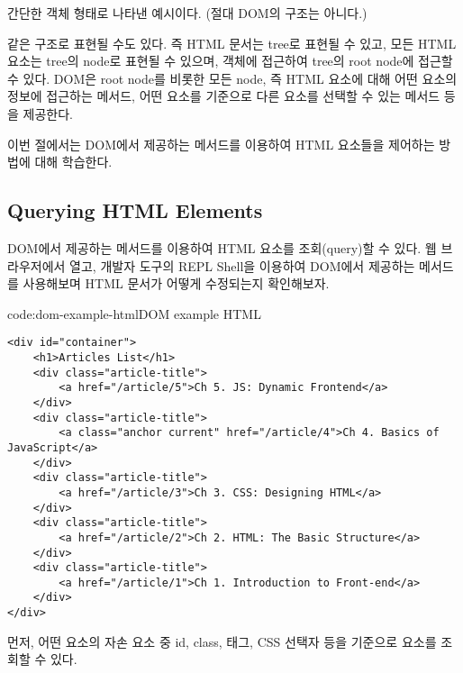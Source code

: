 \는 \을 간단한 객체 형태로 나타낸 예시이다. (절대 DOM의 구조는 아니다.)

    {}

\은 \와 같은 구조로 표현될 수도 있다. 즉 HTML 문서는 tree로 표현될 수 있고, 모든 HTML 요소는 tree의 node로 표현될 수 있으며,  객체에 접근하여 tree의 root node에 접근할 수 있다. DOM은 root node를 비롯한 모든 node, 즉 HTML 요소에 대해 어떤 요소의 정보에 접근하는 메서드, 어떤 요소를 기준으로 다른 요소를 선택할 수 있는 메서드 등을 제공한다.

이번 절에서는 DOM에서 제공하는 메서드를 이용하여 HTML 요소들을 제어하는 방법에 대해 학습한다.

\subsection*{Querying HTML Elements}

DOM에서 제공하는 메서드를 이용하여 HTML 요소를 조회(query)할 수 있다. \을 웹 브라우저에서 열고, 개발자 도구의 REPL Shell을 이용하여 DOM에서 제공하는 메서드를 사용해보며 HTML 문서가 어떻게 수정되는지 확인해보자.

\begin{code}{code:dom-example-html}{DOM example HTML}
\begin{verbatim}
<div id="container">
    <h1>Articles List</h1>
    <div class="article-title">
        <a href="/article/5">Ch 5. JS: Dynamic Frontend</a>
    </div>
    <div class="article-title">
        <a class="anchor current" href="/article/4">Ch 4. Basics of JavaScript</a>
    </div>
    <div class="article-title">
        <a href="/article/3">Ch 3. CSS: Designing HTML</a>
    </div>
    <div class="article-title">
        <a href="/article/2">Ch 2. HTML: The Basic Structure</a>
    </div>
    <div class="article-title">
        <a href="/article/1">Ch 1. Introduction to Front-end</a>
    </div>
</div>
\end{verbatim}
\end{code}

먼저, 어떤 요소의 자손 요소 중 id, class, 태그, CSS 선택자 등을 기준으로 요소를 조회할 수 있다.

